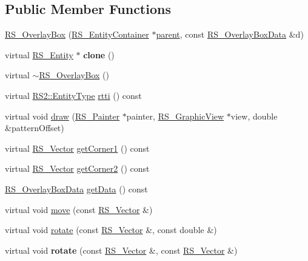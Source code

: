 \subsection*{Public Member Functions}
\begin{DoxyCompactItemize}
\item 
\hyperlink{classRS__OverlayBox_aa26db5dc3b4c9f1103efea4483dd613d}{R\-S\-\_\-\-Overlay\-Box} (\hyperlink{classRS__EntityContainer}{R\-S\-\_\-\-Entity\-Container} $\ast$\hyperlink{classRS__Entity_a80358a8d2fc6739a516a278dc500b49f}{parent}, const \hyperlink{classRS__OverlayBoxData}{R\-S\-\_\-\-Overlay\-Box\-Data} \&d)
\item 
\hypertarget{classRS__OverlayBox_a0b19cc2714fd295b0ababd7e193a0731}{virtual \hyperlink{classRS__Entity}{R\-S\-\_\-\-Entity} $\ast$ {\bfseries clone} ()}\label{classRS__OverlayBox_a0b19cc2714fd295b0ababd7e193a0731}

\item 
virtual \hyperlink{classRS__OverlayBox_ac43a43655652c51870f25a017d7d8bc6}{$\sim$\-R\-S\-\_\-\-Overlay\-Box} ()
\item 
virtual \hyperlink{classRS2_a8f26d1b981e1e85cff16738b43337e6a}{R\-S2\-::\-Entity\-Type} \hyperlink{classRS__OverlayBox_ab3761e6331522235b5df36fe22ea8573}{rtti} () const 
\item 
virtual void \hyperlink{classRS__OverlayBox_af6618d3f7cf36c5ec45514bbd9fb62a1}{draw} (\hyperlink{classRS__Painter}{R\-S\-\_\-\-Painter} $\ast$painter, \hyperlink{classRS__GraphicView}{R\-S\-\_\-\-Graphic\-View} $\ast$view, double \&pattern\-Offset)
\item 
virtual \hyperlink{classRS__Vector}{R\-S\-\_\-\-Vector} \hyperlink{classRS__OverlayBox_aee5554f95f3acbfe4751d693c1be4f0a}{get\-Corner1} () const 
\item 
virtual \hyperlink{classRS__Vector}{R\-S\-\_\-\-Vector} \hyperlink{classRS__OverlayBox_abd55e4d56775d92ebdb86a2d4c0571cd}{get\-Corner2} () const 
\item 
\hyperlink{classRS__OverlayBoxData}{R\-S\-\_\-\-Overlay\-Box\-Data} \hyperlink{classRS__OverlayBox_a4cdf11d9a9bfec2aa93b34e526d190ae}{get\-Data} () const 
\item 
virtual void \hyperlink{classRS__OverlayBox_a9bf1ea7b789b6fbc596f4656764a6d03}{move} (const \hyperlink{classRS__Vector}{R\-S\-\_\-\-Vector} \&)
\item 
virtual void \hyperlink{classRS__OverlayBox_a833e4397044c49628c055129cef11686}{rotate} (const \hyperlink{classRS__Vector}{R\-S\-\_\-\-Vector} \&, const double \&)
\item 
\hypertarget{classRS__OverlayBox_a683599d5984cda0457c5a812d5689c8d}{virtual void {\bfseries rotate} (const \hyperlink{classRS__Vector}{R\-S\-\_\-\-Vector} \&, const \hyperlink{classRS__Vector}{R\-S\-\_\-\-Vector} \&)}\label{classRS__OverlayBox_a683599d5984cda0457c5a812d5689c8d}


\end{DoxyCompactItemize}
